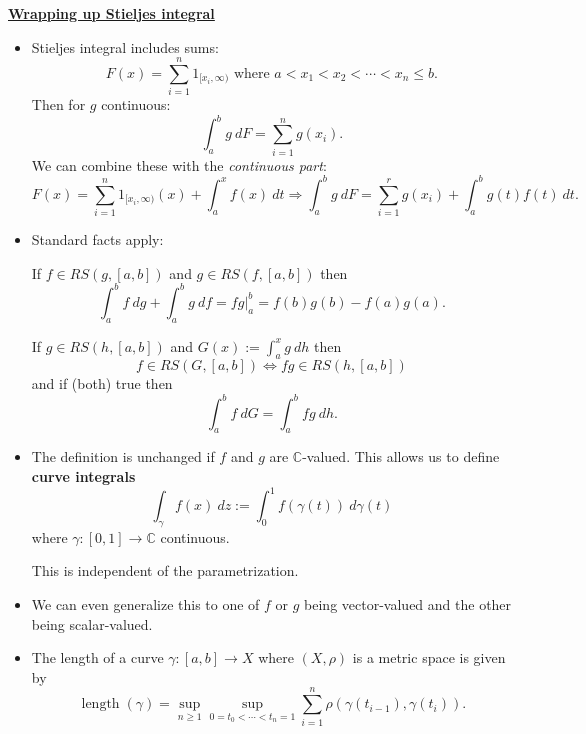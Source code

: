 \documentclass{notes}
\begin{document}
{\boldmath \bfseries \underline{Wrapping up Stieljes integral}}

\begin{rmk}
  \begin{itemize}
    \item Stieljes integral includes sums: 
    \[
      F(x) = \sum_{i = 1}^n 1_{[x_i, \infty)} \text{ where } a < x_1 < x_2 < \cdots < x_n \leq b.
    \]
    Then for $g$ continuous: 
    \[
      \int_a^b g\ dF = \sum_{i = 1}^n g(x_i).
    \]
    We can combine these with the \textit{continuous part}: 
    \[
      F(x) = \sum_{i = 1}^n 1_{[x_i, \infty)}(x) + \int_a^x f(x)\ dt \Rightarrow \int_a^b g\ dF = \sum_{i = 1}^r g(x_i) + \int_a^b g(t) f(t)\ dt.
    \]
    
    \item Standard facts apply: 

    \begin{lem}
      If $f \in RS(g, [a, b])$ and $g \in RS(f, [a, b])$ then 
      \[
        \int_a^b f\ dg + \int_a^b g\ df = f g \Big |_a^b = f(b) g(b) - f(a) g(a).
      \]
    \end{lem}
    
    \begin{lem}[Substitution]
      If $g \in RS(h, [a, b])$ and $G(x) := \int_a^x g\ dh$ then 
      \[
        f \in RS(G, [a, b]) \Leftrightarrow f g \in RS(h, [a, b])
      \]
      and if (both) true then 
      \[
        \int_a^b f\ dG = \int_a^b f g\ dh.
      \]
    \end{lem}
    
    \item The definition is unchanged if $f$ and $g$ are $\mathbb C$-valued.
    This allows us to define {\boldmath \bfseries curve integrals} 
    \[
      \int_\gamma f(x)\ dz := \int_0^1 f(\gamma(t))\ d\gamma(t)
    \]
    where $\gamma \colon [0, 1] \to \mathbb C$ continuous.

    This is independent of the parametrization.
    
    \item We can even generalize this to one of $f$ or $g$ being vector-valued and the other being scalar-valued.
      
    \item The length of a curve $\gamma \colon [a, b] \to X$ where $(X, \rho)$ is a metric space is given by 
    \[
      \operatorname{length}(\gamma) = \sup_{n \geq 1} \sup_{0 = t_0 < \cdots < t_n = 1} \sum_{i = 1}^n \rho(\gamma(t_{i - 1}), \gamma(t_i)).
    \]
    

\end{itemize}
\end{rmk}
\end{document}
